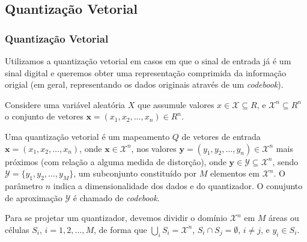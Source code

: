 \subsection{Quantização Vetorial}

\begin{frame}[allowframebreaks]
  \frametitle{Quantização Vetorial}
  Utilizamos a quantização vetorial em casos em que o sinal de entrada já é um sinal digital
  e queremos obter uma representação comprimida da informação origial (em geral, representando
  os dados originais através de um \textit{codebook}).

  \vspace{1cm}
  Considere uma variável aleatória $X$ que assumule valores $x \in \mathcal{X} \subseteq \mathit{R}$,
  e $\mathcal{X}^n \subseteq \mathit{R}^n$ o conjunto de vetores $\mathbf{x} = (x_1, x_2, \ldots, x_n) \in \mathit{R}^n$.

  \framebreak

  Uma quantização vetorial é um mapeamento $Q$  de vetores de entrada $\mathbf{x} = (x_1, x_2, \ldots, x_n )$,
  onde $\mathbf{x} \in \mathcal{X}^n$, nos valores $\mathbf{y} = (y_1 , y_2 , \ldots , y_n ) \in \mathcal{X}^n$
  mais próximos (com relação a alguma medida de distorção), onde $\mathbf{y} \in \mathcal{Y} \subseteq \mathcal{X}^n$,
  sendo $\mathcal{Y} = \{y_1 , y_2 , \ldots, y_M\}$, um subconjunto constituído por $M$ elementos em $\mathcal{X}^n$.
  O parâmetro $n$ indica a dimensionalidade dos dados e do quantizador. O conujunto de aproximação $\mathcal{Y}$ 
  é chamado de \textit{codebook}.

  \vspace{3em}
  Para se projetar um quantizador, devemos dividir o domínio $\mathcal{X}^n$ em $M$ áreas ou células $S_i$,
  $i = 1, 2, \ldots, M$, de forma que $\bigcup_i S_i = \mathcal{X}^n$, $S_i \cap S_j = \emptyset$, $i \neq j$,
  e $y_i \in S_i$.
\end{frame}


